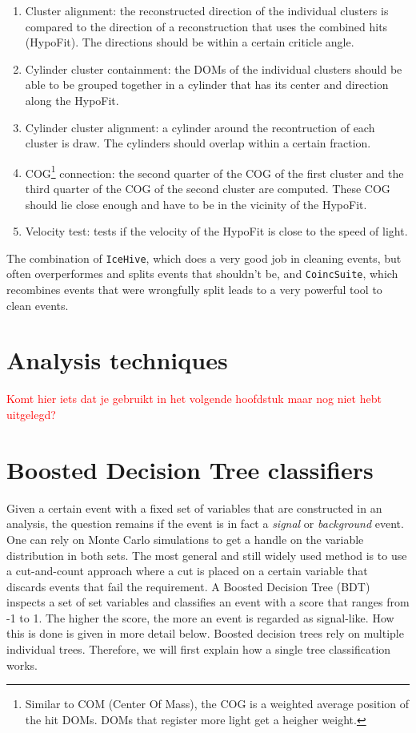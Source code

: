 \begin{enumerate}
\item Cluster alignment: the reconstructed direction of the individual clusters is compared to the direction of a reconstruction that uses the combined hits (HypoFit). The directions should be within a certain criticle angle.
\item Cylinder cluster containment: the DOMs of the individual clusters should be able to be grouped together in a cylinder that has its center and direction along the HypoFit.
\item Cylinder cluster alignment: a cylinder around the recontruction of each cluster is draw. The cylinders should overlap within a certain fraction.
\item COG\footnote{Similar to COM (Center Of Mass), the COG is a weighted average position of the hit DOMs. DOMs that register more light get a heigher weight.} connection: the second quarter of the COG of the first cluster and the third quarter of the COG of the second cluster are computed. These COG should lie close enough and have to be in the vicinity of the HypoFit.
\item Velocity test: tests if the velocity of the HypoFit is close to the speed of light.
\end{enumerate}

\vspace{2mm}
\noindent The combination of \texttt{IceHive}, which does a very good job in cleaning events, but often overperformes and splits events that shouldn't be, and \texttt{CoincSuite}, which recombines events that were wrongfully split leads to a very powerful tool to clean events.

\section{Analysis techniques}
\textcolor{red}{Komt hier iets dat je gebruikt in het volgende hoofdstuk maar nog niet hebt uitgelegd?}
\section{Boosted Decision Tree classifiers}
Given a certain event with a fixed set of variables that are constructed in an analysis, the question remains if the event is in fact a \textit{signal} or \textit{background} event. One can rely on Monte Carlo simulations to get a handle on the variable distribution in both sets. The most general and still widely used method is to use a cut-and-count approach where a cut is placed on a certain variable that discards events that fail the requirement. A Boosted Decision Tree (BDT) inspects a set of set variables and classifies an event with a score that ranges from -1 to 1. The higher the score, the more an event is regarded as signal-like. How this is done is given in more detail below. Boosted decision trees rely on multiple individual trees. Therefore, we will first explain how a single tree classification works.


